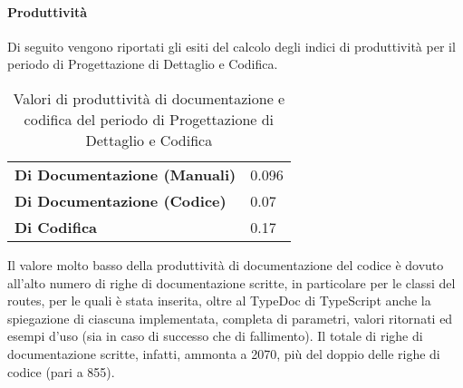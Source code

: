 \paragraph*{Produttività}
Di seguito vengono riportati gli esiti del calcolo degli indici di produttività per il periodo di Progettazione di Dettaglio e Codifica.
\begin{table}[H]
\centering
\begin{tabular}{|l|l|}
\cline{1-2}
\textbf{Di Documentazione (Manuali)} & 0.096 \\ \cline{1-2} %
\textbf{Di Documentazione (Codice)} & 0.07 \\ \cline{1-2} %
\textbf{Di Codifica} & 0.17 \\ \cline{1-2} %
\end{tabular}
\caption{Valori di produttività di documentazione e codifica del periodo di Progettazione di Dettaglio e Codifica}
\end{table}
Il valore molto basso della produttività di documentazione del codice è dovuto all'alto numero di righe di documentazione scritte, in particolare per le classi del  routes, per le quali è stata inserita, oltre al TypeDoc di TypeScript anche la spiegazione di ciascuna  implementata, completa di parametri, valori ritornati ed esempi d'uso (sia in caso di successo che di fallimento). Il totale di righe di documentazione scritte, infatti, ammonta a 2070, più del doppio delle righe di codice (pari a 855).
